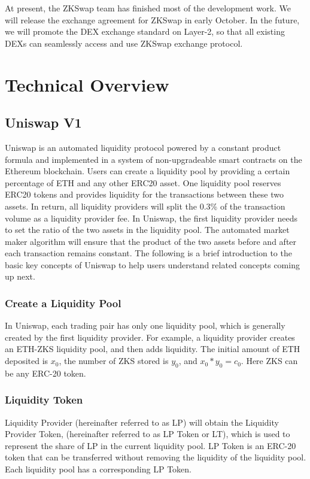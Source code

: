 \documentclass[]{template/llncs}
\begin{document}
At present, the ZKSwap team has finished most of the development work. We will release the exchange agreement for ZKSwap in early October. In the future, we will promote the DEX exchange standard on Layer-2, so that all existing DEXs can seamlessly access and use ZKSwap exchange protocol.



\section{Technical Overview
}

\subsection{Uniswap V1}
Uniswap\cite{uniswapv1} is an automated liquidity protocol powered by a constant product formula and implemented in a system of non-upgradeable smart contracts on the Ethereum blockchain. Users can create a liquidity pool by providing a certain percentage of ETH and any other ERC20 asset. One liquidity pool reserves ERC20 tokens and provides liquidity for the transactions between these two assets. In return, all liquidity providers will split the 0.3\% of the transaction volume as a liquidity provider fee. In Uniswap, the first liquidity provider needs to set the ratio of the two assets in the liquidity pool. The automated market maker algorithm will ensure that the product of the two assets before and after each transaction remains constant. The following is a brief introduction to the basic key concepts of Uniswap to help users understand related concepts coming up next.


\subsubsection{Create a Liquidity Pool}

In Uniswap, each trading pair has only one liquidity pool, which is generally created by the first liquidity provider. For example, a liquidity provider creates an ETH-ZKS liquidity pool, and then adds liquidity. The initial amount of ETH deposited is $x_0$, the number of ZKS stored is $y_0$, and $x_0*y_0 = c_0$. Here ZKS can be any ERC-20 token.


\subsubsection{Liquidity Token}

Liquidity Provider (hereinafter referred to as LP) will obtain the Liquidity Provider Token, (hereinafter referred to as LP Token or LT), which is used to represent the share of LP in the current liquidity pool. LP Token is an ERC-20 token that can be transferred without removing the liquidity of the liquidity pool. Each liquidity pool has a corresponding LP Token. 
\end{document}
